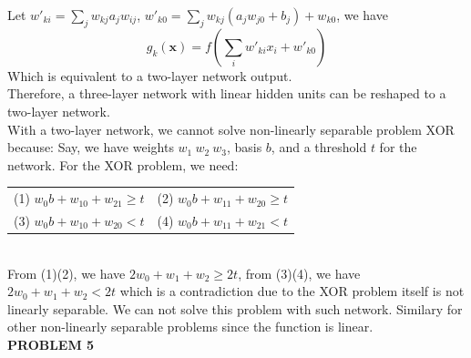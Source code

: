 \documentclass[11pt,a4paper,fleqn]{article}
\begin{document}
Let $w'_{ki}=\sum_jw_{kj}a_jw_{ij}$, $w'_{k0}=\sum_jw_{kj}(a_jw_{j0}+b_j)+w_{k0}$, we have
$$g_k(\mathbf{x}) = f(\sum_iw'_{ki}x_i+w'_{k0})$$
Which is equivalent to a two-layer network output.\\
Therefore, a three-layer network with linear hidden units can be reshaped to a two-layer network.\\
With a two-layer network, we cannot solve non-linearly separable problem XOR because: Say, we have weights $w_1\ w_2\ w_3$, basis $b$, and a threshold $t$ for the network. For the XOR problem, we need:\\
\begin{tabular}{cc}
(1) $w_0b+w_10+w_21 \ge t$&(2) $w_0b+w_11+w_20 \ge t$\\
(3) $w_0b+w_10+w_20 < t$&(4) $w_0b+w_11+w_21 < t$\\
\end{tabular}\\
From (1)(2), we have $2w_0+w_1+w_2 \ge 2t$, from (3)(4), we have $2w_0+w_1+w_2 < 2t$ which is a contradiction due to the XOR problem itself is not linearly separable. We can not solve this problem with such network. Similary for other non-linearly separable problems since the function is linear.\\
\newpage \noindent
\textbf{PROBLEM 5}\\ \\
\end{document}
